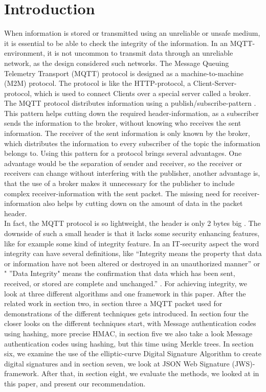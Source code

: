 \section{Introduction}

When information is stored or transmitted using an unreliable or unsafe medium, it is essential to be able to check the integrity of the information. In an MQTT-environment, it is not uncommon to transmit data through an unreliable network, as the design considered such networks. The Message Queuing Telemetry Transport (MQTT) protocol is designed as a machine-to-machine (M2M) protocol. The protocol is like the HTTP-protocol, a Client-Server-protocol, which is used to connect Clients over a special server called a broker. The MQTT protocol distributes information using a publish/subscribe-pattern \cite{LIMI}. This pattern helps cutting down the required header-information, as a subscriber sends the information to the broker, without knowing who receives the sent information. The receiver of the sent information is only known by the broker, which distributes the information to every subscriber of the topic the information belongs to. Using this pattern for a protocol brings several advantages. One advantage would be the separation of sender and receiver, so the receiver or receivers can change without interfering with the publisher, another advantage is, that the use of a broker makes it unnecessary for the publisher to include complex receiver-information with the sent packet. The missing need for receiver-information also helps by cutting down on the amount of data in the packet header. \\
In fact, the MQTT protocol is so lightweight, the header is only 2 bytes big \cite{IBM}. The downside of such a small header is that it lacks some security enhancing features, like for example some kind of integrity feature. In an IT-security aspect the word integrity can have several definitions, like “Integrity means the property that data or information have not been altered or destroyed in an unauthorized manner”\cite{INTI1} or " ”Data Integrity" means the confirmation that data which has been sent, received, or stored are complete and unchanged.” \cite{INTI2}. For achieving integrity, we look at three different algorithms and one framework in this paper. After the related work in section two, in section three a MQTT packet used for demonstrations of the different techniques gets introduced. In section four the closer looks on the different techniques start, with Message authentication codes using hashing, more precise HMAC, in section five we also take a look Message authentication codes using hashing, but this time using Merkle trees. In section six, we examine the use of the elliptic-curve Digital Signature Algorithm to create digital signatures and in section seven, we look at JSON Web Signature (JWS)-framework. After that, in section eight, we evaluate the methods, we looked at in this paper, and present our recommendation.
